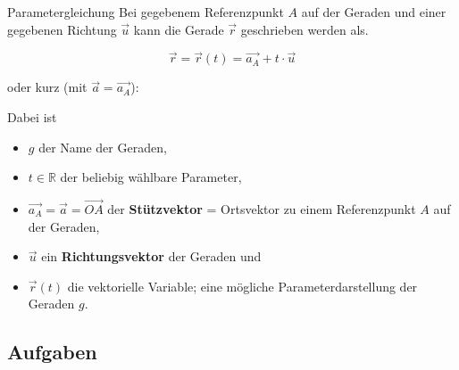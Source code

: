 \begin{definition}{Parametergleichung}{}
  Bei gegebenem Referenzpunkt $A$ auf der Geraden und einer gegebenen
  Richtung $\vec{u}$ kann die Gerade $\vec{r}$ geschrieben werden als.
  
  $$\vec{r} = \vec{r}(t) = \overrightarrow{a_A} + t\cdot{} \vec{u}$$

  oder kurz (mit $\vec{a} = \overrightarrow{a_A}$):

  \begin{center}\end{center}
  
  Dabei ist
  \begin{itemize}
    \item $g$ der Name der Geraden,
    \item $t\in\mathbb{R}$ der beliebig wählbare Parameter,
    \item $\overrightarrow{a_A} = \vec{a} = \overrightarrow{OA}$ der
      \textbf{Stützvektor} = Ortsvektor zu einem Referenzpunkt $A$ auf der Geraden,
    \item $\vec{u}$ ein
      \textbf{Richtungsvektor} der Geraden und
    \item $\vec{r}(t)$ die vektorielle Variable; eine mögliche
      Parameterdarstellung der Geraden $g$.
  \end{itemize}
  
\end{definition}

\subsection*{Aufgaben}


\newpage%
